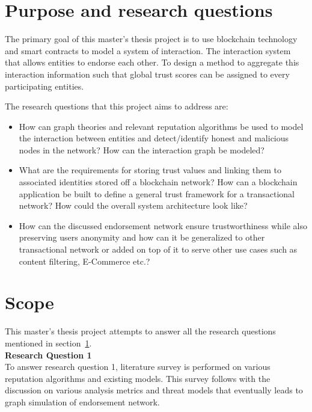 \section{Purpose and research questions} \label{ResearchQuestions}
The primary goal of this master's thesis project is to use blockchain
technology and smart contracts to model a system of interaction. The
interaction system that allows entities to endorse each other. To design a
method to aggregate this interaction information such that global trust scores
can be assigned to every participating entities. \par
The research questions that this project aims to address are: 
\begin{itemize}
		\item How can graph theories and relevant reputation algorithms be used
			to model the interaction between entities and detect/identify
			honest and malicious nodes in the network? How can the interaction
			graph be modeled? \label{question1}
		\item What are the requirements for storing trust values and linking
			them to associated identities stored off a blockchain network? How
			can a blockchain application be built to define a general trust
			framework for a transactional network? How could the overall system
			architecture look like? \label{question2} 
		\item How can the discussed endorsement network ensure trustworthiness
			while also preserving users anonymity and how can it be generalized
			to other transactional network or added on top of it to serve other
			use cases such as content filtering, E-Commerce
			etc.?\label{question3} 
\end{itemize}
\section{Scope} 
This master's thesis project attempts to answer all the research questions mentioned
in section~\ref{ResearchQuestions}. \\
\textbf{Research Question 1}\\
To answer research question 1, literature survey is performed on various
reputation algorithms and existing models. This survey follows with the
discussion on various analysis metrics and threat models that eventually leads to
graph simulation of endorsement network.  

